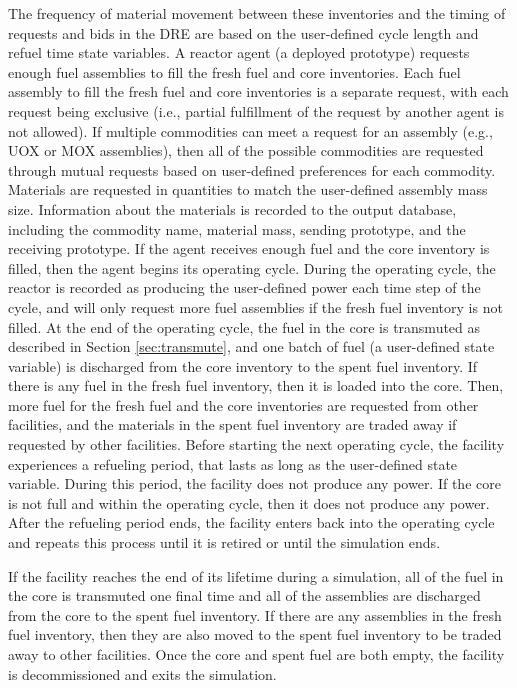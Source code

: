 The frequency of material movement between these inventories and 
the timing of requests and bids in the \gls{DRE} are based on 
the user-defined cycle length and refuel time state variables. 
A reactor agent (a deployed prototype) requests enough fuel assemblies 
to fill the fresh fuel and core inventories.
Each fuel assembly to fill the fresh fuel and core inventories 
is a separate request, with each request 
being exclusive (i.e., partial fulfillment of the request by another 
agent is not allowed). If multiple commodities can meet a request for 
an assembly (e.g., UOX or MOX assemblies), then all of the possible 
commodities are requested through mutual requests based on user-defined 
preferences for each commodity. Materials are requested in quantities 
to match the user-defined assembly mass size. Information about the 
materials is recorded to the output database, including the 
commodity name, material mass, sending prototype, and the receiving 
prototype. If the agent 
receives enough fuel and the core inventory is filled, then the 
agent begins its operating cycle. During the operating cycle, the 
reactor is recorded as producing the user-defined power each time step 
of the cycle, and will only request more fuel assemblies if the 
fresh fuel inventory is not filled. At the end of the operating 
cycle, the fuel in the core is transmuted as described in Section 
\ref{sec:transmute}, and one batch of fuel (a user-defined state variable)
is discharged from the core inventory to the spent fuel inventory. 
If there is any fuel in the fresh fuel inventory, then it is 
loaded into the core. Then, more fuel for the fresh fuel and the 
core inventories are requested from other facilities, and the 
materials in the spent fuel inventory are traded away if requested 
by other facilities. Before starting the next operating cycle, the 
facility experiences a refueling period, that lasts as long as the 
user-defined state variable. During this period, the facility does 
not produce any power. If the core is not full and within the operating 
cycle, then it does not produce any power. After the refueling period 
ends, the facility enters back into the operating cycle and repeats 
this process until it is retired or until the simulation ends. 

If the facility reaches the end of its lifetime during a simulation, 
all of the fuel in 
the core is transmuted one final time and all of the 
assemblies are discharged from the core to the spent fuel
inventory. If there are any assemblies in the fresh fuel inventory, then 
they are also moved to the spent fuel inventory to be traded 
away to other facilities. Once the core and spent fuel are 
both empty, the facility is decommissioned and exits the simulation.

